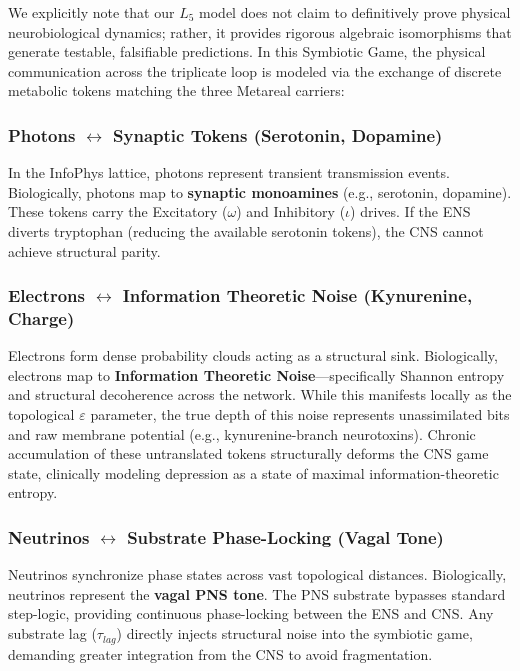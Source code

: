 \begin{hypothesis}
We explicitly note that our $L_5$ model does not claim to definitively prove physical neurobiological dynamics; rather, it provides rigorous algebraic isomorphisms that generate testable, falsifiable predictions. In this Symbiotic Game, the physical communication across the triplicate loop is modeled via the exchange of discrete metabolic tokens matching the three Metareal carriers:

\subsubsection*{Photons \texorpdfstring{$\leftrightarrow$}{\textleftrightarrow} Synaptic Tokens (Serotonin, Dopamine)}
In the InfoPhys lattice, photons represent transient transmission events. Biologically, photons map to \textbf{synaptic monoamines} (e.g., serotonin, dopamine). These tokens carry the Excitatory ($\omega$) and Inhibitory ($\iota$) drives. If the ENS diverts tryptophan (reducing the available serotonin tokens), the CNS cannot achieve structural parity.

\subsubsection*{Electrons \texorpdfstring{$\leftrightarrow$}{\textleftrightarrow} Information Theoretic Noise (Kynurenine, Charge)}
Electrons form dense probability clouds acting as a structural sink. Biologically, electrons map to \textbf{Information Theoretic Noise}---specifically Shannon entropy and structural decoherence across the network. While this manifests locally as the topological $\varepsilon$ parameter, the true depth of this noise represents unassimilated bits and raw membrane potential (e.g., kynurenine-branch neurotoxins). Chronic accumulation of these untranslated tokens structurally deforms the CNS game state, clinically modeling depression as a state of maximal information-theoretic entropy.

\subsubsection*{Neutrinos \texorpdfstring{$\leftrightarrow$}{\textleftrightarrow} Substrate Phase-Locking (Vagal Tone)}
Neutrinos synchronize phase states across vast topological distances. Biologically, neutrinos represent the \textbf{vagal PNS tone}. The PNS substrate bypasses standard step-logic, providing continuous phase-locking between the ENS and CNS. Any substrate lag ($\tau_{lag}$) directly injects structural noise into the symbiotic game, demanding greater integration from the CNS to avoid fragmentation.


\end{hypothesis}
